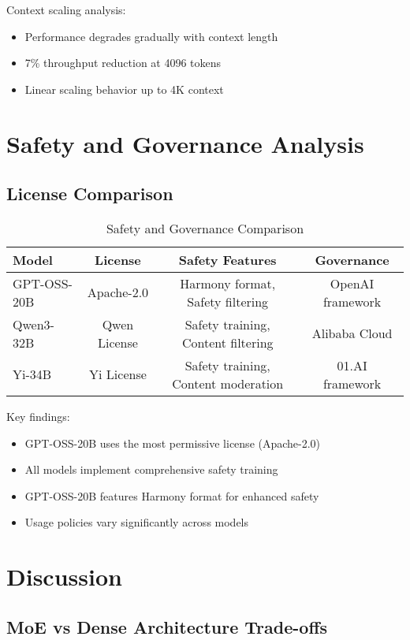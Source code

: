 \documentclass[11pt]{article}
\begin{document}
Context scaling analysis:
\begin{itemize}
    \item Performance degrades gradually with context length
    \item 7\% throughput reduction at 4096 tokens
    \item Linear scaling behavior up to 4K context
\end{itemize}

\section{Safety and Governance Analysis}

\subsection{License Comparison}

\begin{table}[h]
\centering
\caption{Safety and Governance Comparison}
\begin{tabular}{lccc}
\toprule
Model & License & Safety Features & Governance \\
\midrule
GPT-OSS-20B & Apache-2.0 & Harmony format, Safety filtering & OpenAI framework \\
Qwen3-32B & Qwen License & Safety training, Content filtering & Alibaba Cloud \\
Yi-34B & Yi License & Safety training, Content moderation & 01.AI framework \\
\bottomrule
\end{tabular}
\end{table}

Key findings:
\begin{itemize}
    \item GPT-OSS-20B uses the most permissive license (Apache-2.0)
    \item All models implement comprehensive safety training
    \item GPT-OSS-20B features Harmony format for enhanced safety
    \item Usage policies vary significantly across models
\end{itemize}

\section{Discussion}

\subsection{MoE vs Dense Architecture Trade-offs}
\end{document}
